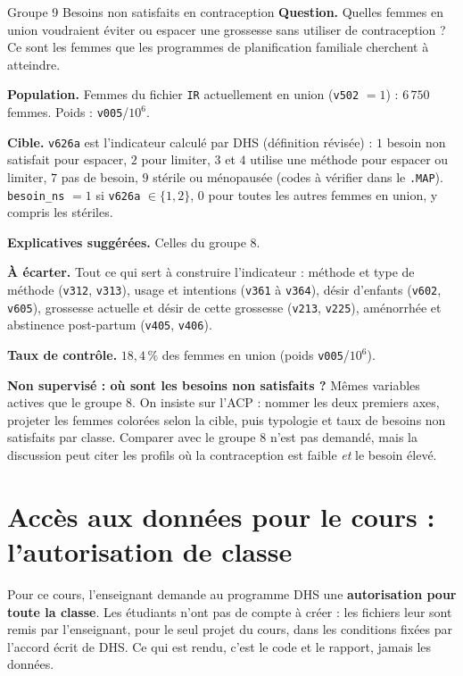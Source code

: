\documentclass[11pt]{article}
\begin{document}
\begin{fiche}{Groupe 9 \textendash{} Besoins non satisfaits en contraception}
\textbf{Question.} Quelles femmes en union voudraient éviter ou espacer une grossesse sans utiliser de contraception ? Ce sont les femmes que les programmes de planification familiale cherchent à atteindre.

\textbf{Population.} Femmes du fichier \texttt{IR} actuellement en union (\texttt{v502} $=1$) : $6\,750$ femmes. Poids : \texttt{v005}/$10^6$.

\textbf{Cible.} \texttt{v626a} est l'indicateur calculé par DHS (définition révisée) : $1$ besoin non satisfait pour espacer, $2$ pour limiter, $3$ et $4$ utilise une méthode pour espacer ou limiter, $7$ pas de besoin, $9$ stérile ou ménopausée (codes à vérifier dans le \texttt{.MAP}). \texttt{besoin\_ns} $=1$ si \texttt{v626a} $\in\{1,2\}$, $0$ pour toutes les autres femmes en union, y compris les stériles.

\textbf{Explicatives suggérées.} Celles du groupe 8.

\textbf{À écarter.} Tout ce qui sert à construire l'indicateur : méthode et type de méthode (\texttt{v312}, \texttt{v313}), usage et intentions (\texttt{v361} à \texttt{v364}), désir d'enfants (\texttt{v602}, \texttt{v605}), grossesse actuelle et désir de cette grossesse (\texttt{v213}, \texttt{v225}), aménorrhée et abstinence post-partum (\texttt{v405}, \texttt{v406}).

\textbf{Taux de contrôle.} $18{,}4\,\%$ des femmes en union (poids \texttt{v005}/$10^6$).

\textbf{Non supervisé : où sont les besoins non satisfaits ?} Mêmes variables actives que le groupe 8. On insiste sur l'ACP : nommer les deux premiers axes, projeter les femmes colorées selon la cible, puis typologie et taux de besoins non satisfaits par classe. Comparer avec le groupe 8 n'est pas demandé, mais la discussion peut citer les profils où la contraception est faible \emph{et} le besoin élevé.
\end{fiche}


\section{Accès aux données pour le cours : l'autorisation de classe}
\label{sec:acces}

\begin{aretenir}
Pour ce cours, l'enseignant demande au programme DHS une \textbf{autorisation pour toute la classe}. Les étudiants n'ont pas de compte à créer : les fichiers leur sont remis par l'enseignant, pour le seul projet du cours, dans les conditions fixées par l'accord écrit de DHS. Ce qui est rendu, c'est le code et le rapport, jamais les données.
\end{aretenir}
\end{document}
